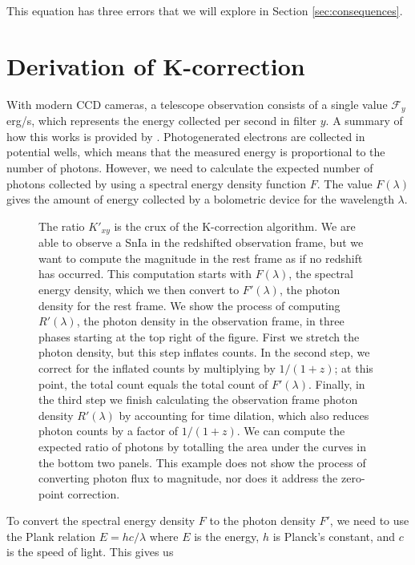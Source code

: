 \documentclass[linenumbers]{aastex631}
\begin{document}
This equation has three errors that we will explore in Section
\ref{sec:consequences}.

\section{Derivation of K-correction}
\label{sec:derivation}

With modern CCD cameras, a telescope observation consists of a single value
$\mathcal{F}_y$ erg/s, which represents the energy collected per second in
filter $y$. A summary of how this works is provided by \citet{lesser2015}.
Photogenerated electrons are collected in potential wells, which means that the
measured energy is proportional to the number of photons. However, we need to
calculate the expected number of photons collected by using a spectral energy
density function $F$. The value $F(\lambda)$ gives the amount of energy
collected by a bolometric device for the wavelength $\lambda$.

\begin{figure}
  \caption{The ratio $K'_{xy}$ is the crux of the K-correction algorithm. We
  are able to observe a SnIa in the redshifted observation frame, but we want
  to compute the magnitude in the rest frame as if no redshift has occurred.
  This computation starts with $F(\lambda)$, the spectral energy density, which
  we then convert to $F'(\lambda)$, the photon density for the rest frame. We
  show the process of computing $R'(\lambda)$, the photon density in the
  observation frame, in three phases starting at the top right of the figure.
  First we stretch the photon density, but this step inflates counts. In the
  second step, we correct for the inflated counts by multiplying by $1/(1+z)$;
  at this point, the total count equals the total count of $F'(\lambda)$.
  Finally, in the third step we finish calculating the observation frame photon
  density $R'(\lambda)$ by accounting for time dilation, which also reduces
  photon counts by a factor of $1/(1+z)$. We can compute the expected ratio of
  photons by totalling the area under the curves in the bottom two panels. This
  example does not show the process of converting photon flux to magnitude, nor
  does it address the zero-point correction.
  }
  \label{fig:k-example}
\end{figure}

To convert the spectral energy density $F$ to the photon density $F'$, we need
to use the Plank relation $E = hc / \lambda$ where $E$ is the energy, $h$
is Planck's constant, and $c$ is the speed of light. This gives us
\end{document}
